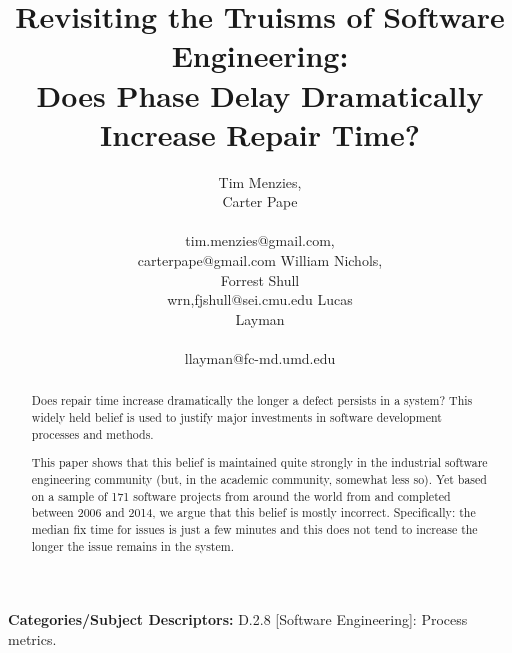 \documentclass{sig-alternate}
\begin{document}
\title{Revisiting the Truisms of Software Engineering:\\ Does Phase Delay Dramatically Increase  Repair Time?}
\author{
\alignauthor
Tim Menzies, \\Carter Pape\\
       \\
       tim.menzies@gmail.com,\\carterpape@gmail.com
\alignauthor
William Nichols,\\ Forrest Shull\\
wrn,fjshull@sei.cmu.edu
\alignauthor
Lucas \\Layman\\
       \\ 
       llayman@fc-md.umd.edu
} 


 
\maketitle
\begin{abstract}
Does
repair time increase dramatically
the longer a defect persists in a system?
This widely held belief is used to justify 
major investments in  software development
 processes and methods.

This paper shows that this belief is maintained
quite strongly in the industrial software engineering
community (but, in the academic community, somewhat less so).
Yet based on a sample of 
171 software projects from around the world from 
and completed between 2006 and 2014, we argue that this belief is mostly 
incorrect. Specifically: the median fix time for issues
is just a few minutes and this does not tend to increase
the longer the issue remains in the system. 

\end{abstract}

\vspace{1mm}
\noindent
{\bf Categories/Subject Descriptors:} 
D.2.8 [Software Engineering]: Process metrics.
\end{document}
